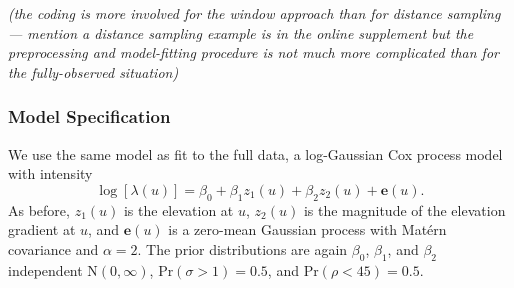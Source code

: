 \documentclass[]{interact}
\begin{document}
{\it (the coding is more involved for the window approach than for distance
sampling --- mention a distance sampling example is in the online supplement
but the preprocessing and model-fitting procedure is not much more complicated
than for the fully-observed situation)}


\subsubsection{Model Specification}

We use the same model as fit to the full data, a log-Gaussian Cox process model
with intensity
\begin{displaymath}
\log\left[\lambda(u)\right] = \beta_{0} + \beta_{1} z_{1}(u)
+ \beta_{2} z_{2}(u) + \mathbf{e}(u).
\end{displaymath}
As before, \(z_{1}(u)\) is the elevation at \(u\), \(z_{2}(u)\) is the
magnitude of the elevation gradient at \(u\), and \(\mathbf{e}(u)\) is a
zero-mean Gaussian process with Mat\'{e}rn covariance and \(\alpha = 2\).
The prior distributions are again \(\beta_{0}\), \(\beta_{1}\), and
\(\beta_{2}\) independent \(\mathrm{N}(0, \infty)\),
\(\mathrm{Pr}(\sigma > 1) = 0.5\), and \(\mathrm{Pr}(\rho < 45) = 0.5\).
\end{document}
